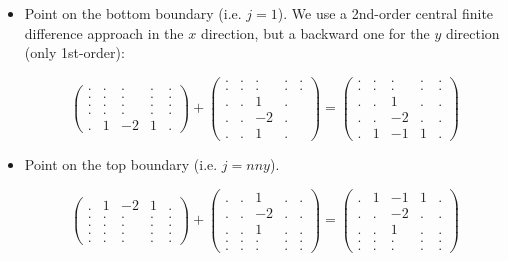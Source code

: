 \begin{itemize}
\item Point on the bottom boundary (i.e. $j=1$).
We use a 2nd-order central finite difference 
approach in the $x$ direction, but a backward one for the $y$ direction 
(only 1st-order):

\[
\begin{pmatrix}
. & . &  . & . & . \\
. & . &  . & . & . \\
. & . &  . & . & . \\
. & . &  . & . & . \\
. & 1 & -2 & 1 & . 
\end{pmatrix}
+
\begin{pmatrix}
. & . &  . & . & . \\
. & . &  . & . & . \\
. & . & 1 & . &  \\
. & .& -2 & . &  \\
. & . & 1 & . &   
\end{pmatrix}
=
\begin{pmatrix}
. & . &  . & . & . \\
. & . &  . & . & . \\
. & . &  1 & . & . \\
. & . &  -2 & . & . \\
. & 1 &  -1 & 1 & . 
\end{pmatrix}
\]


\item Point on the top boundary (i.e. $j=nny$). 


\[
\begin{pmatrix}
. & 1 &  -2 & 1 & . \\
. & . &  . & . & . \\
. & . &  . & . & . \\
. & . &  . & . & . \\
. & . &  . & . & . 
\end{pmatrix}
+
\begin{pmatrix}
. & . &  1 & . & . \\
. & . &  -2 & . & . \\
. & . &  1 & . & . \\
. & . &  . & . & . \\
. & . &  . & . & . 
\end{pmatrix}
=
\begin{pmatrix}
. & 1 &  -1 & 1 & . \\
. & . &  -2 & . & . \\
. & . &  1 & . & . \\
. & . &  . & . & . \\
. & . &  . & . & . 
\end{pmatrix}
\]



\end{itemize}
